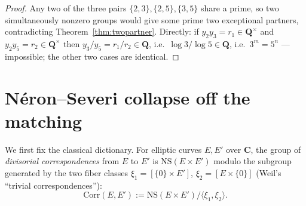 \documentclass[11pt]{article}
\theoremstyle{definition}
\theoremstyle{remark}
\newcommand{\Q}{\mathbf{Q}}
\newcommand{\C}{\mathbf{C}}
\newcommand{\NS}{\mathrm{NS}}
\newcommand{\Corr}{\mathrm{Corr}}
\begin{document}
\begin{proof}
Any two of the three pairs $\{2,3\}, \{2,5\}, \{3,5\}$ share a prime, so two
simultaneously nonzero groups would give some prime two exceptional
partners, contradicting Theorem~\ref{thm:twopartner}. Directly: if
$y_2 y_3 = r_1 \in \Q^\times$ and $y_2 y_5 = r_2 \in \Q^\times$ then
$y_3/y_5 = r_1/r_2 \in \Q$, i.e.\ $\log 3/\log 5 \in \Q$, i.e.\
$3^m = 5^n$ --- impossible; the other two cases are identical.
\end{proof}

\section{N\'eron--Severi collapse off the matching}
\label{sec:NS}

We first fix the classical dictionary. For elliptic curves $E, E'$ over
$\C$, the group of \emph{divisorial correspondences} from $E$ to $E'$ is
$\NS(E \times E')$ modulo the subgroup generated by the two fiber classes
$\xi_1 = [\{0\}\times E']$, $\xi_2 = [E\times\{0\}]$ (Weil's ``trivial
correspondences''):
\[
\Corr(E, E') := \NS(E \times E') / \langle \xi_1, \xi_2 \rangle .
\]
\end{document}
